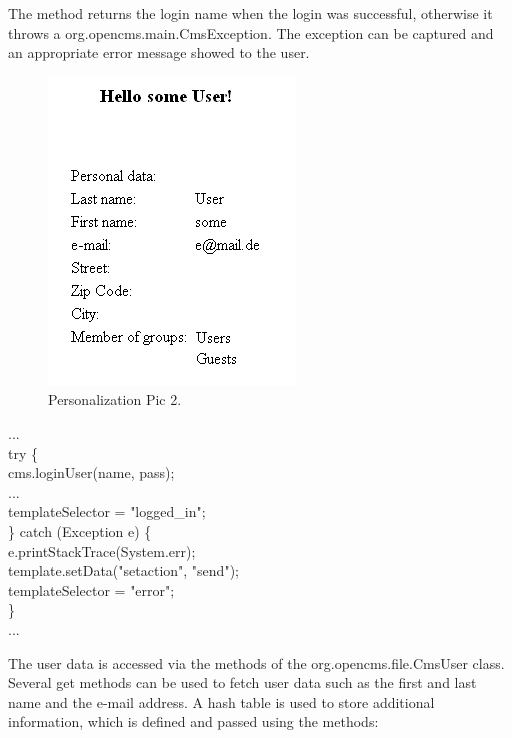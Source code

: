The method returns the login name when the login was successful,
otherwise it throws a {\class org.opencms.main.CmsException}. 
The exception can be captured and an appropriate error message 
showed to the user.

\begin{figure}
\begin{center}
\includegraphics[clip,width=0.4\linewidth]{pics/modules/49}
\end{center}
\caption[Personalization Pic 2]{Personalization Pic 2.}
\label{HelloUser}
\end{figure}

\begin{java}
...\\
try \{\\
\jtabc                cms.loginUser(name, pass);\\
\jtabc                ...\\
\jtabc                templateSelector = "logged\_in";\\
\jtaba          \} catch (Exception e) \{\\
\jtabc                e.printStackTrace(System.err);\\
\jtabc                template.setData("setaction", "send");\\
\jtabc                templateSelector = "error";\\
\jtaba        \}\\
...\\
\end{java}

The user data is accessed via the methods of the {\class org.opencms.file.CmsUser} class. 
Several get methods can be used to fetch user data such as the first and last
name and the e-mail address. A hash table is used to store additional
information, which is defined and passed using the methods:

